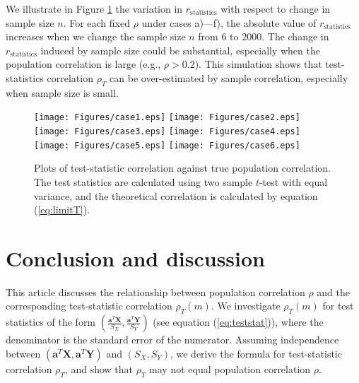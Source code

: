 \documentclass[review]{elsarticle}
\begin{document}
We illustrate in Figure \ref{fig:tstat} the variation in $r_\text{statistics}$ with 
respect to change in sample size $n$. For each fixed $\rho$ under cases a)---f), the absolute 
value of $r_\text{statistics}$  increases when we change the sample size $n$ from $6$ to 
$2000$. The change in $r_\text{statistics}$ induced by sample size could be substantial, 
especially when the population correlation is large (e.g., $\rho > 0.2$). This simulation shows 
that test-statistics correlation $\rho_T$ can be over-estimated by sample correlation, 
especially when sample size is small.

\begin{figure}[!th]
	\centering
	\texttt{[image: Figures/case1.eps]}
	\texttt{[image: Figures/case2.eps]}
	\texttt{[image: Figures/case3.eps]}
	\texttt{[image: Figures/case4.eps]}
	\texttt{[image: Figures/case5.eps]}
	\texttt{[image: Figures/case6.eps]}
	\caption[Plots of test-statistic correlation against true population 
	correlation]{Plots of test-statistic correlation against true population 
		correlation. The test statistics are calculated 
		using two sample $t$-test with equal variance, and the theoretical correlation is 
		calculated by 
		equation (\ref{eq:limitT}).}
	\label{fig:tstat}
\end{figure}




\section{Conclusion and discussion}

This article discusses the relationship between population correlation $\rho$ and the 
corresponding test-statistic correlation $\rho_T(m)$. We 
investigate $\rho_T(m)$ for test statistics 
of the form $(\frac{\bm a^T\bm X}{S_X}, \frac{\bm a^T\bm Y}{S_Y})$ (see equation 
(\ref{eq:teststat})), where the denominator is the standard error of the numerator. Assuming 
independence between $(\bm a^T\bm X, \bm a^T\bm Y)$ and $(S_X, S_Y)$, we derive the formula for 
test-statistic correlation $\rho_T$, and show that $\rho_T$ may not equal population 
correlation $\rho$.  
\end{document}
